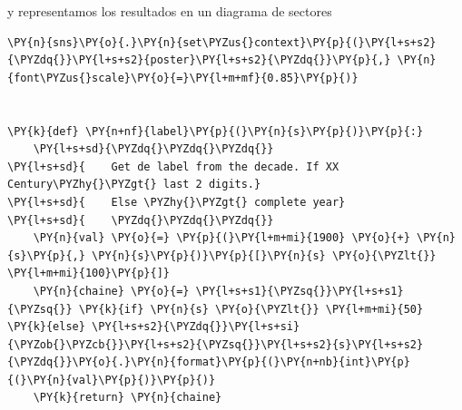     y representamos los resultados en un diagrama de sectores

    \begin{tcolorbox}[breakable, size=fbox, boxrule=1pt, pad at break*=1mm,colback=cellbackground, colframe=cellborder]
\begin{Verbatim}[commandchars=\\\{\}]
\PY{n}{sns}\PY{o}{.}\PY{n}{set\PYZus{}context}\PY{p}{(}\PY{l+s+s2}{\PYZdq{}}\PY{l+s+s2}{poster}\PY{l+s+s2}{\PYZdq{}}\PY{p}{,} \PY{n}{font\PYZus{}scale}\PY{o}{=}\PY{l+m+mf}{0.85}\PY{p}{)}


\PY{k}{def} \PY{n+nf}{label}\PY{p}{(}\PY{n}{s}\PY{p}{)}\PY{p}{:}
    \PY{l+s+sd}{\PYZdq{}\PYZdq{}\PYZdq{}}
\PY{l+s+sd}{    Get de label from the decade. If XX Century\PYZhy{}\PYZgt{} last 2 digits.}
\PY{l+s+sd}{    Else \PYZhy{}\PYZgt{} complete year}
\PY{l+s+sd}{    \PYZdq{}\PYZdq{}\PYZdq{}}
    \PY{n}{val} \PY{o}{=} \PY{p}{(}\PY{l+m+mi}{1900} \PY{o}{+} \PY{n}{s}\PY{p}{,} \PY{n}{s}\PY{p}{)}\PY{p}{[}\PY{n}{s} \PY{o}{\PYZlt{}} \PY{l+m+mi}{100}\PY{p}{]}
    \PY{n}{chaine} \PY{o}{=} \PY{l+s+s1}{\PYZsq{}}\PY{l+s+s1}{\PYZsq{}} \PY{k}{if} \PY{n}{s} \PY{o}{\PYZlt{}} \PY{l+m+mi}{50} \PY{k}{else} \PY{l+s+s2}{\PYZdq{}}\PY{l+s+si}{\PYZob{}\PYZcb{}}\PY{l+s+s2}{\PYZsq{}}\PY{l+s+s2}{s}\PY{l+s+s2}{\PYZdq{}}\PY{o}{.}\PY{n}{format}\PY{p}{(}\PY{n+nb}{int}\PY{p}{(}\PY{n}{val}\PY{p}{)}\PY{p}{)}
    \PY{k}{return} \PY{n}{chaine}


\end{Verbatim}
\end{tcolorbox}
